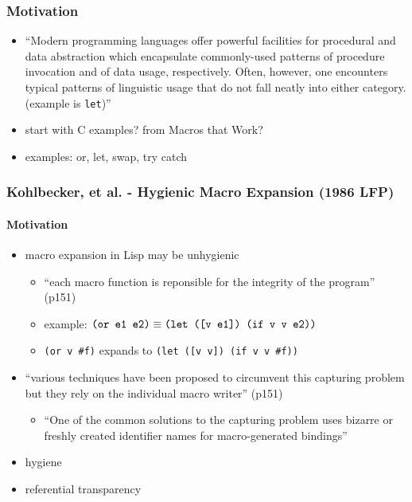 \documentclass[12pt]{article}	%
\begin{document}
\subsubsection*{Motivation}
\begin{itemize}
	\item ``Modern programming languages offer powerful facilities for procedural and data abstraction which encapsulate commonly-used patterns of procedure invocation and of data usage, respectively. Often, however, one encounters typical patterns of linguistic usage that do not fall neatly into either category. (example is \verb!let!)''~\cite[p77]{Kohlbecker1987Macrobyexample}
	\item start with C examples? from Macros that Work?~\cite{Clinger1991Macros}
	\item examples: or, let, swap, try catch
	\end{itemize}


\subsubsection*{Kohlbecker, et al. - Hygienic Macro Expansion (1986 LFP)}

\paragraph{Motivation}

\begin{itemize}

	\item macro expansion in Lisp may be unhygienic
		\begin{itemize}
			\item ``each macro function is reponsible for the integrity of the program'' (p151)
			\item example: $\verb!(or e1 e2)! \equiv \verb!(let ([v e1]) (if v v e2))!$
			\item \verb!(or v #f)! expands to \verb!(let ([v v]) (if v v #f))!
		\end{itemize}
		
	\item ``various techniques have been proposed to circumvent this capturing problem but they rely on the individual macro writer'' (p151)
		\begin{itemize}
			\item ``One of the common solutions to the capturing problem uses bizarre or freshly created identifier names for macro-generated bindings''
		\end{itemize}
	\item hygiene
	\item referential transparency
\end{itemize}
	
\end{document}

